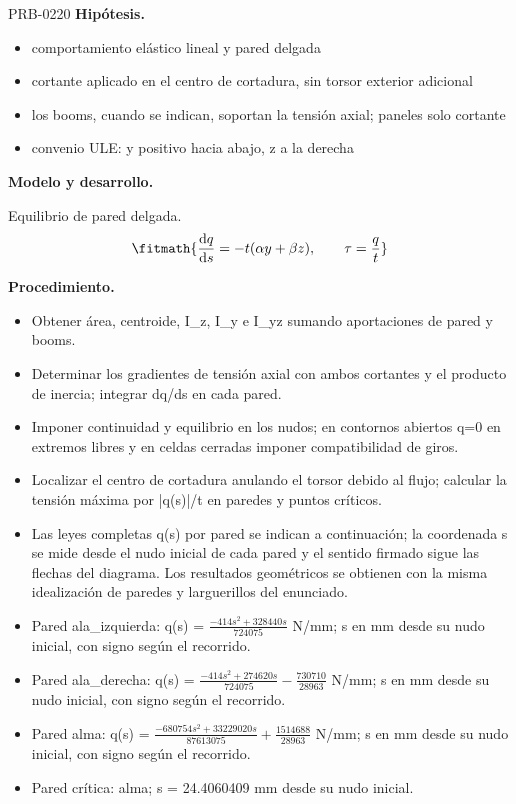 \begin{studiumworked}{PRB-0220}
\textbf{Hipótesis.}\begin{itemize}\item comportamiento elástico lineal y pared delgada
\item cortante aplicado en el centro de cortadura, sin torsor exterior adicional
\item los booms, cuando se indican, soportan la tensión axial; paneles solo cortante
\item convenio ULE: y positivo hacia abajo, z a la derecha\end{itemize}

\textbf{Modelo y desarrollo.}

Equilibrio de pared delgada.\[\fitmath{\frac{\mathrm{d}q}{\mathrm{d}s}=-t(\alpha y+\beta z),\qquad \tau=\frac{q}{t}}\]

\textbf{Procedimiento.}\begin{itemize}\item Obtener área, centroide, I\_z, I\_y e I\_yz sumando aportaciones de pared y booms.
\item Determinar los gradientes de tensión axial con ambos cortantes y el producto de inercia; integrar dq/ds en cada pared.
\item Imponer continuidad y equilibrio en los nudos; en contornos abiertos q=0 en extremos libres y en celdas cerradas imponer compatibilidad de giros.
\item Localizar el centro de cortadura anulando el torsor debido al flujo; calcular la tensión máxima por |q(s)|/t en paredes y puntos críticos.
\item Las leyes completas q(s) por pared se indican a continuación; la coordenada s se mide desde el nudo inicial de cada pared y el sentido firmado sigue las flechas del diagrama. Los resultados geométricos se obtienen con la misma idealización de paredes y larguerillos del enunciado.
\item Pared ala\_izquierda: q(s) = $\frac{- 414 s^{2} + 328440 s}{724075}$ N/mm; s en mm desde su nudo inicial, con signo según el recorrido.
\item Pared ala\_derecha: q(s) = $\frac{- 414 s^{2} + 274620 s}{724075} - \frac{730710}{28963}$ N/mm; s en mm desde su nudo inicial, con signo según el recorrido.
\item Pared alma: q(s) = $\frac{- 680754 s^{2} + 33229020 s}{87613075} + \frac{1514688}{28963}$ N/mm; s en mm desde su nudo inicial, con signo según el recorrido.
\item Pared crítica: alma; s = 24.4060409 mm desde su nudo inicial.\end{itemize}


\end{studiumworked}
